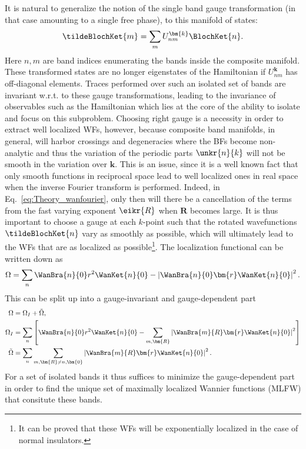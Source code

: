It is natural to generalize the notion of the single band gauge transformation (in that case amounting to a single free phase), to this manifold of states:
\begin{equation}
	\tildeBlochKet{m} = \sum_m U_{nm}^{\bm{k}} \BlochKet{n}.
\end{equation}
Here $n,m$ are band indices enumerating the bands inside the composite manifold.
These transformed states are no longer eigenstates of the Hamiltonian if $U_{nm}^{\bm{k}}$ has off-diagonal elements.
Traces performed over such an isolated set of bands are invariant w.r.t. to these gauge transformations, leading to the invariance of observables such as the Hamiltonian which lies at the core of the ability to isolate and focus on this subproblem.
Choosing right gauge is a necessity in order to extract well localized WFs, however, because composite band manifolds, in general, will harbor crossings and degeneracies where the BFs become non-analytic and thus the variation of the periodic parts $\unkr{n}{k}$ will not be smooth in the variation over $\bm{k}$.
This is an issue, since it is a well known fact that only smooth functions in reciprocal space lead to well localized ones in real space when the inverse Fourier transform is performed.
Indeed, in Eq.~\ref{eq:Theory_wanfourier}, only then will there be a cancellation of the terms from the fast varying exponent $\eikr{R}$ when $\bm{R}$ becomes large.
It is thus important to choose a gauge at each $k$-point such that the rotated wavefunctions $\tildeBlochKet{n}$ vary as smoothly as possible, which will ultimately lead to the WFs that are as localized as possible\footnote{It can be proved that these WFs will be exponentially localized in the case of normal insulators.}. 
The localization functional can be written down as
\begin{equation}
	\Omega =\sum_n \WanBra{n}{0}r^2\WanKet{n}{0} - \left|\WanBra{n}{0}\bm{r}\WanKet{n}{0}\right|^2.
\end{equation}
This can be split up into a gauge-invariant and gauge-dependent part
\begin{align}
	\Omega &= \Omega_I + \tilde\Omega,  \\
	\Omega_I &= \sum_n \left[\WanBra{n}{0} r^2 \WanKet{n}{0} - \sum_{m,\bm{R}} \left| \WanBra{m}{R} \bm{r} \WanKet{n}{0}\right|^2\right] \label{eq:Theory_omegaI}\\
	\tilde\Omega &= \sum_n \sum_{m,\bm{R} \neq n,\bm{0}} \left|\WanBra{m}{R} \bm{r} \WanKet{n}{0}\right|^2.
\end{align}
For a set of isolated bands it thus suffices to minimize the gauge-dependent part in order to find the  unique set of maximally localized Wannier functions (MLFW) that consitute these bands\cite{Kunes2004, Marzari2012}.
